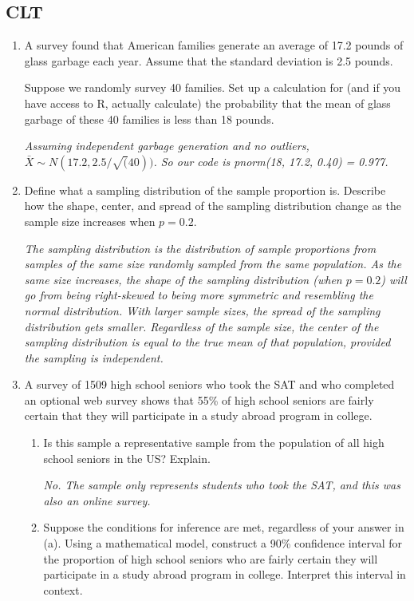 \documentclass[12pt]{article}   	%
\newcommand{\soln}[2]{\textit{\textcolor{custom_red}{#2}}}{}
\begin{document}
\subsection*{CLT}
\begin{enumerate}
\item
  A survey found that American families generate an average of 17.2
  pounds of glass garbage each year. Assume that the standard deviation
  is 2.5 pounds.

  Suppose we randomly survey 40 families. Set up a calculation for (and
  if you have access to R, actually calculate) the probability that the
  mean of glass garbage of these 40 families is less than 18 pounds.
  
  \soln{}{Assuming independent garbage generation and no outliers, $\bar{X} \sim N(17.2, 2.5/\sqrt(40))$. So our code is pnorm(18, 17.2, 0.40) = 0.977. }
\item
  Define what a sampling distribution of the sample proportion is.
  Describe how the shape, center, and spread of the sampling
  distribution change as the sample size increases when \(p=0.2\).
  
  \soln{}{The sampling distribution is the distribution of sample proportions from samples of the
same size randomly sampled from the same population. As the same size increases, the
shape of the sampling distribution (when $p = 0.2$) will go from being right-skewed to
being more symmetric and resembling the normal distribution. With larger sample sizes,
the spread of the sampling distribution gets smaller. Regardless of the sample size, the
center of the sampling distribution is equal to the true mean of that population, provided
the sampling is independent.} 
\item
  A survey of 1509 high school seniors who took the SAT and who
  completed an optional web survey shows that 55\% of high school
  seniors are fairly certain that they will participate in a study
  abroad program in college.

  \begin{enumerate}

  \item
    Is this sample a representative sample from the population of all
    high school seniors in the US? Explain.
    
    \soln{}{No. The sample only represents students who took the SAT, and this was also an
online survey.}
    
  \item
    Suppose the conditions for inference are met, regardless of your
    answer in (a). Using a mathematical model, construct a 90\%
    confidence interval for the proportion of high school seniors who
    are fairly certain they will participate in a study abroad program
    in college. Interpret this interval in context.
    

\end{enumerate}
\end{enumerate}
\end{document}
